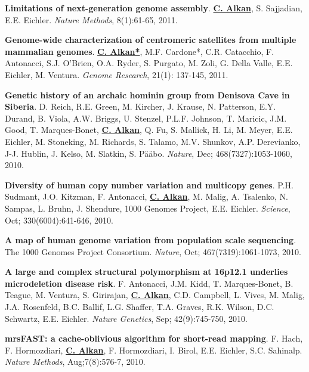 \documentclass[margin,line]{res}
\begin{document}
\begin{resume}
\vspace{-.2cm}
{\bf Limitations of next-generation genome assembly}.
{\bf {\underline {C. Alkan}}}, S. Sajjadian, E.E. Eichler.
{\em Nature Methods}, 8(1):61-65, 2011. \\

\vspace{-.2cm}
{\bf Genome-wide characterization of centromeric satellites from multiple mammalian genomes}.
{\bf {\underline {C. Alkan*}}}, M.F. Cardone*, C.R. Catacchio, F. Antonacci,
 S.J. O'Brien, O.A. Ryder, S. Purgato, M. Zoli, G. Della Valle, E.E. Eichler, M. Ventura.
{\em Genome Research}, 21(1): 137-145, 2011.


\vspace{-.2cm}
{\bf Genetic history of an archaic hominin group from Denisova Cave in Siberia}.
D. Reich, R.E. Green, M. Kircher, J. Krause, 
N. Patterson, E.Y. Durand, B. Viola, A.W. Briggs, 
U. Stenzel, P.L.F. Johnson, T. Maricic, J.M. Good, 
T. Marques-Bonet, {\bf {\underline {C. Alkan}}}, Q. Fu, S. Mallick, H. Li, 
M. Meyer, E.E. Eichler, M. Stoneking, M. Richards, 
S. Talamo, M.V. Shunkov, A.P. Derevianko, J-J. Hublin, 
J. Kelso, M. Slatkin, S. P\"{a}\"{a}bo.
{\em Nature}, Dec; 468(7327):1053-1060, 2010.

\vspace{-.2cm}
{\bf Diversity of human copy number variation and multicopy genes}. P.H. Sudmant, J.O. Kitzman, F. Antonacci, 
{\bf {\underline {C. Alkan}}}, M. Malig, A. Tsalenko, N. Sampas, L. Bruhn, J. Shendure, 1000 Genomes Project, E.E. Eichler.
{\em Science}, Oct; 330(6004):641-646, 2010.

\vspace{-.2cm}
{\bf A map of human genome variation from population scale sequencing}. The 1000 Genomes Project Consortium.
{\em Nature}, Oct; 467(7319):1061-1073, 2010.

\vspace{-.2cm}
{\bf A large and complex structural polymorphism at 16p12.1 underlies microdeletion disease risk}. F. Antonacci, J.M. Kidd,
 T. Marques-Bonet, B. Teague, M. Ventura, S. Girirajan, {\bf {\underline {C. Alkan}}}, C.D. Campbell, L. Vives, M. Malig, 
J.A. Rosenfeld, B.C. Ballif, L.G. Shaffer, T.A. Graves, R.K. Wilson, D.C. Schwartz, E.E. Eichler. {\em Nature 
Genetics}, Sep; 42(9):745-750, 2010.

\vspace{-.2cm}
{\bf mrsFAST: a cache-oblivious algorithm for short-read mapping}. F.  Hach,  F. Hormozdiari, {\bf {\underline {C. Alkan}}}, F. Hormozdiari,
 I. Birol,  E.E. Eichler, S.C. Sahinalp. {\em Nature Methods}, Aug;7(8):576-7, 2010.


\end{resume}
\end{document}
